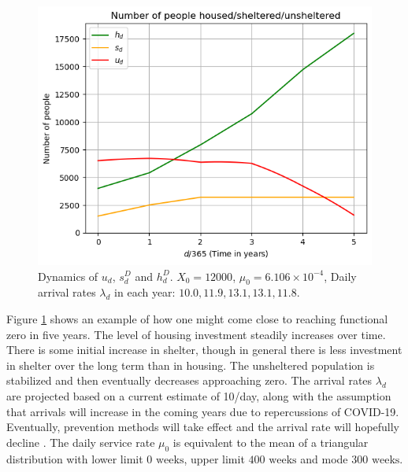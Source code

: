 \documentclass{article}
\begin{document}
\begin{figure}[h!]%
    \centering
    \includegraphics[scale=0.8]{u_t_example.png}
    \caption{Dynamics of $u_d$, $s^D_d$ and $h^D_d$. $X_0 = 12000$, $\mu_0 = 6.106 \times 10^{-4}$, Daily arrival rates $\lambda_d$ in each year: $10.0,11.9,13.1,13.1,11.8$.}
    \label{fig:ut-illustrative}
\end{figure}

Figure \ref{fig:ut-illustrative} shows an example of how one might come close to reaching functional zero in five years.  The level of housing investment steadily increases over time.  There is some initial increase in shelter, though in general there is less investment in shelter over the long term than in housing.  The unsheltered population is stabilized and then eventually decreases approaching zero.  The arrival rates $\lambda_d$ are projected based on a current estimate of 10/day, along with the assumption that arrivals will increase in the coming years due to repercussions of COVID-19.  Eventually, prevention methods will take effect and the arrival rate will hopefully decline \citep{hometogether2022}. The daily service rate $\mu_0$ is equivalent to the mean of a triangular distribution with lower limit $0 \text{ weeks}$, upper limit $400 \text{ weeks}$ and mode $300 \text{ weeks}$. 
\end{document}
